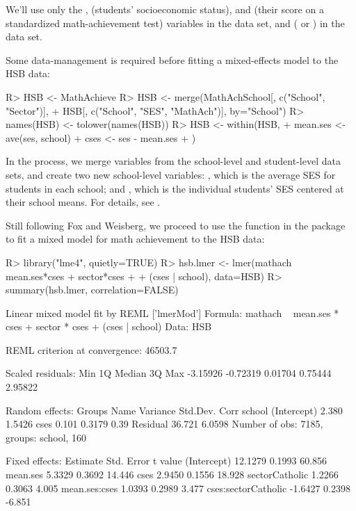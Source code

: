 \documentclass[
]{jss}
\begin{document}
We'll use only the ,  (students' socioeconomic
status), and  (their score on a standardized
math-achievement test) variables in the  data set, and
 ( or ) in the
 data set.

Some data-management is required before fitting a mixed-effects model to
the HSB data:

\begin{CodeChunk}
\begin{CodeInput}
R> HSB <- MathAchieve
R> HSB <- merge(MathAchSchool[, c("School", "Sector")],
+              HSB[, c("School", "SES", "MathAch")], by="School")
R> names(HSB) <- tolower(names(HSB))
R> HSB <- within(HSB, {
+   mean.ses <- ave(ses, school)
+   cses <- ses - mean.ses
+ })
\end{CodeInput}
\end{CodeChunk}

In the process, we merge variables from the school-level and
student-level data sets, and create two new school-level variables:
, which is the average SES for students in each school;
and , which is the individual students' SES centered at their
school means. For details, see \citet[Sec. 7.2.2]{FoxWeisberg:2019}.

Still following Fox and Weisberg, we proceed to use the 
function in the  package \citep{BatesEtAl:2015} to fit a mixed
model for math achievement to the HSB data:

\begin{CodeChunk}
\begin{CodeInput}
R> library("lme4", quietly=TRUE)
R> hsb.lmer <- lmer(mathach ~ mean.ses*cses + sector*cses
+                    + (cses | school), data=HSB)
R> summary(hsb.lmer, correlation=FALSE)
\end{CodeInput}
\begin{CodeOutput}
Linear mixed model fit by REML ['lmerMod']
Formula: mathach ~ mean.ses * cses + sector * cses + (cses | school)
   Data: HSB

REML criterion at convergence: 46503.7

Scaled residuals: 
     Min       1Q   Median       3Q      Max 
-3.15926 -0.72319  0.01704  0.75444  2.95822 

Random effects:
 Groups   Name        Variance Std.Dev. Corr
 school   (Intercept)  2.380   1.5426       
          cses         0.101   0.3179   0.39
 Residual             36.721   6.0598       
Number of obs: 7185, groups:  school, 160

Fixed effects:
                    Estimate Std. Error t value
(Intercept)          12.1279     0.1993  60.856
mean.ses              5.3329     0.3692  14.446
cses                  2.9450     0.1556  18.928
sectorCatholic        1.2266     0.3063   4.005
mean.ses:cses         1.0393     0.2989   3.477
cses:sectorCatholic  -1.6427     0.2398  -6.851
\end{CodeOutput}
\end{CodeChunk}
\end{document}
